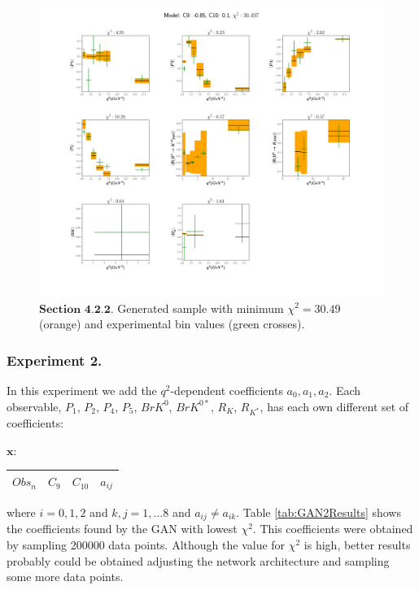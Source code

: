 \documentclass[a4paper,fleqn]{cas-dc}
\begin{document}
\begin{figure}
	\includegraphics[width=\textwidth]{images/prediction.pdf}
	\caption{\(\textbf{Section 4.2.2}.\) Generated sample with minimum \(\chi^2 = 30.49\) (orange) and experimental bin values (green crosses).}
	\label{FIG:GANExp1}
\end{figure}

\subsubsection{Experiment 2. }
In this experiment we add the \(q^2\)-dependent coefficients \(a_0, a_1,a_2\).  Each observable,  \(P_1\), \(P_2\), \(P_4\), \(P_5\), \(BrK^0\), \(BrK^{0*}\), \(R_K\), \(R_{K^*}\), has each own different set of coefficients:
\begin{center}
	\(\boldsymbol{x:} \)
	\quad
	\begin{tabular}{ |c|c|c|c|  } 
		\hline
		\(Obs_n \)   & \(C_9\) & \(C_{10}\) & \(a_{ij}\) \\
		
		\hline
	\end{tabular}
\end{center}
where \(i=0,1,2\) and  \(k,j=1,...8\) and \(a_{ij} \neq a_{ik}\). Table \ref{tab:GAN2Results} shows the coefficients found by the GAN with lowest \(\chi^2 \). This coefficients were obtained by sampling 200000 data points. Although the value for \(\chi^2 \) is high, better results probably could be obtained adjusting the network architecture and sampling some more data points.
\end{document}
